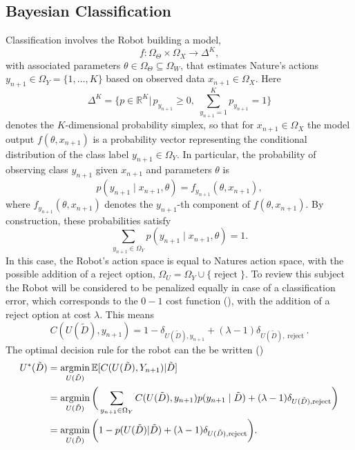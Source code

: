 \subsection{Bayesian Classification}
\label{chp:baycl}
Classification involves the Robot building a model,
\begin{equation}
	f: \Omega_\Theta \times \Omega_X \to \Delta^K,
\end{equation}
with associated parameters $\theta \in \Omega_\Theta\subseteq\Omega_W$, that estimates Nature's actions $y_{n+1}\in \Omega_Y= \{1,\dots,K\}$ based on observed data $x_{n+1}\in \Omega_X$. Here
\begin{equation}
	\Delta^K = \bigg\{p \in \mathbb{R}^K \bigg|\, p_{y_{n+1}} \geq 0,\; \sum_{y_{n+1}=1}^K p_{y_{n+1}} = 1\bigg\}
\end{equation} 
denotes the $K$-dimensional probability simplex, so that for $x_{n+1} \in \Omega_X$ the model output $f(\theta,x_{n+1})$ is a probability vector representing the conditional distribution of the class label $y_{n+1} \in \Omega_Y$. In particular, the probability of observing class $y_{n+1}$ given $x_{n+1}$ and parameters $\theta$ is 
\begin{equation}
	p(y_{n+1} \mid x_{n+1}, \theta) = f_{y_{n+1}}(\theta,x_{n+1}),
	\label{f_dist2}
\end{equation}
where $f_{y_{n+1}}(\theta,x_{n+1})$ denotes the $y_{n+1}$-th component of $f(\theta,x_{n+1})$. 
By construction, these probabilities satisfy
\begin{equation}
	\sum_{y_{n+1} \in \Omega_Y} p(y_{n+1} \mid x_{n+1}, \theta) = 1.
\end{equation}
In this case, the Robot's action space is equal to Natures action space, with the possible addition of a reject option, $\Omega_U=\Omega_Y\cup \{\operatorname{reject}\}$. To review this subject the Robot will be considered to be penalized equally in case of a classification error, which corresponds to the $0-1$ cost function (), with the addition of a reject option at cost $\lambda$. This means
\begin{equation}
	C(U(\tilde{D}),y_{n+1}) = 1- \delta_{U(\tilde{D}),y_{n+1}}+(\lambda-1)\delta_{U(\tilde{D}),\operatorname{reject}}.
\end{equation}
The optimal decision rule for the robot can the be written ()
\begin{equation}
	\begin{split}
		U^*(\tilde{D}) & = \operatorname*{argmin}_{U(\tilde{D})}\mathbb{E}[C(U(\tilde{D}), Y_{n+1})|\tilde{D}]\\
		&= \operatorname*{argmin}_{U(\tilde{D})}\bigg(\sum_{y_{n+1}\in \Omega_Y}C(U(\tilde{D}),y_{n+1})p(y_{n+1}\mid\tilde{D})+(\lambda-1)\delta_{U(\tilde{D}),\operatorname{reject}}\bigg)\\
		& = \operatorname*{argmin}_{U(\tilde{D})}\bigg(1- p(U(\tilde{D})|\tilde{D})+(\lambda-1)\delta_{U(\tilde{D}),\operatorname{reject}}\bigg).
	\end{split}
	\label{eq:expected_cost1}
\end{equation}
